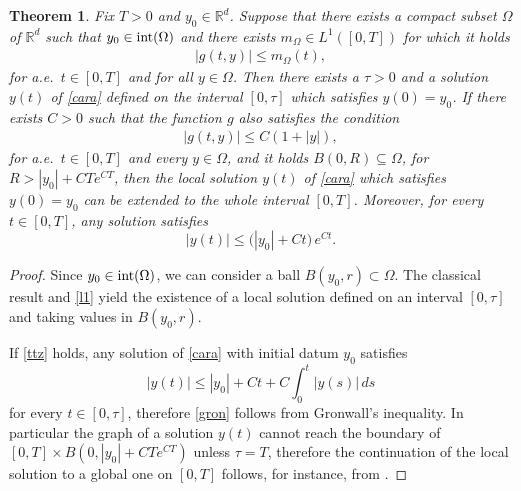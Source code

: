 \documentclass[A4paper,11pt]{article}
\newtheorem{theorem}{Theorem}[section]
\theoremstyle{definition}
\newcommand{\R}{\mathbb{R}}
\begin{document}
\begin{theorem}\label{cara-global}
Fix $T > 0$ and $y_0 \in \R^d$. Suppose that there exists a compact subset $\Omega$ of $\R^d$ such that $y_0 \in \textup{int}(\Omega)$ and there exists $m_{\Omega} \in L^1([0,T])$ for which it holds
\begin{align}\label{l1}
|g(t,y)|\le m_{\Omega}(t),
\end{align}
for a.e.\ $t \in [0,T]$ and for all $y \in \Omega$. Then there exists a $\tau > 0$ and a solution $y(t)$ of \eqref{cara} defined on the interval $[0,\tau]$ which satisfies $y(0)=y_0$. If there exists $C > 0$ such that the function $g$ also satisfies the condition
\begin{align}\label{ttz}
|g(t,y)|\le C(1+|y|),
\end{align}
for a.e.\ $t \in [0,T]$ and every $y \in \Omega$, and it holds $B(0,R) \subseteq \Omega$, for $R > |y_0| + CT e^{CT}$, then the local solution $y(t)$ of \eqref{cara} which satisfies $y(0)=y_0$ can be extended to the whole interval $[0,T]$. Moreover, for every $t \in [0,T]$, any solution satisfies
\begin{equation}\label{gron}
|y(t)|\le \Big(|y_0|+ Ct\Big) \,e^{Ct}.
\end{equation}
\end{theorem}

\begin{proof}
Since $y_0 \in \textup{int}(\Omega)$, we can consider a ball $B(y_0,r) \subset \Omega$. The classical result \cite[Chapter 1, Theorem 1]{Fil} and \eqref{l1} yield the existence of a local solution defined on an interval $[0,\tau]$ and taking values in $B(y_0,r)$.

If \eqref{ttz} holds, any solution of \eqref{cara} with initial datum $y_0$ satisfies
$$
|y(t)|\le |y_0|+ Ct+C\int_0^t |y(s)|\,ds
$$
for every $t \in [0,\tau]$, therefore \eqref{gron} follows from Gronwall's inequality. In particular the graph of a solution $y(t)$ cannot reach the boundary of $[0,T]\times B(0,|y_0|+CTe^{CT})$ unless $\tau=T$, therefore the continuation of the local solution to a global one on $[0,T]$ follows, for instance, from \cite[Chapter 1, Theorem 4]{Fil}.
\end{proof}
\end{document}
